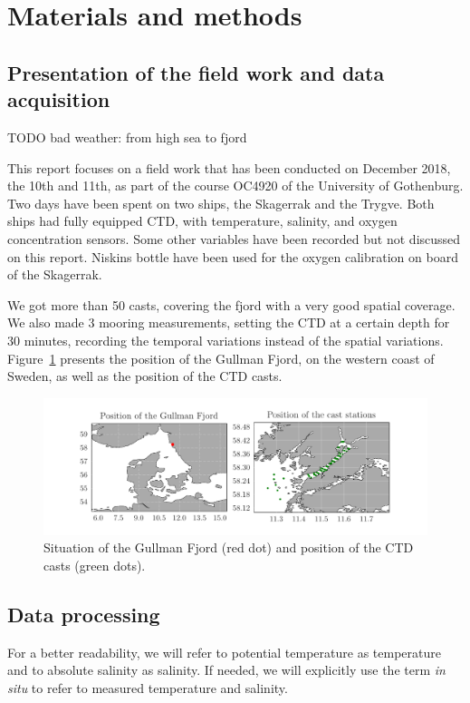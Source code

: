 \documentclass[12pt,a4paper]{article}
\begin{document}
\section{Materials and methods}
\subsection{Presentation of the field work and data acquisition}

TODO bad weather: from high sea to fjord

This report focuses on a field work that has been conducted on December 2018, the
10th and 11th, as part of the course OC4920 of the University of Gothenburg.
Two days have been spent on two ships, the Skagerrak and the Trygve.
Both ships had fully equipped CTD, with temperature, salinity, and oxygen concentration
sensors. Some other variables have been recorded but not discussed on this
report. Niskins bottle have been used for the oxygen calibration on board of
the Skagerrak.

We got more than 50 casts, covering the fjord with a very good spatial coverage.
We also made 3 mooring measurements, setting the CTD at a certain depth
for 30 minutes, recording the temporal variations instead of the
spatial variations.
Figure~\ref{fig:stations} presents the position of the Gullman Fjord, on the western
coast of Sweden, as well as the position of the CTD casts.

\begin{figure}
  \centering
  \includegraphics{stations}
  \caption{\label{fig:stations}Situation of the Gullman Fjord (red dot) and position
    of the CTD casts (green dots).}
\end{figure}

\subsection{Data processing}
For a better readability, we will refer to potential temperature as temperature
and to absolute salinity as salinity.
If needed, we will explicitly use the term {\it in situ} to refer to
measured temperature and salinity.
\end{document}
